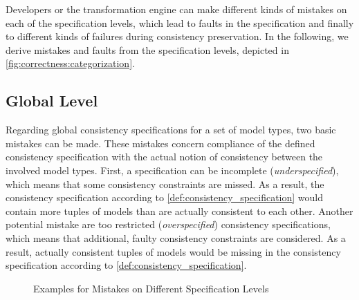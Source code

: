 Developers or the transformation engine can make different kinds of mistakes on each of the specification levels, which lead to faults in the specification and finally to different kinds of failures during consistency preservation.
In the following, we derive mistakes and faults from the specification levels, depicted in \autoref{fig:correctness:categorization}.

\subsection{Global Level}
Regarding global consistency specifications for a set of model types, two basic mistakes can be made. 
These mistakes concern compliance of the defined consistency specification with the actual notion of consistency between the involved model types.
First, a specification can be incomplete (\emph{underspecified}), which means that some consistency constraints are missed. 
As a result, the consistency specification according to \autoref{def:consistency_specification} would contain more tuples of models than are actually consistent to each other. 
Another potential mistake are too restricted (\emph{overspecified}) consistency specifications, which means that additional, faulty consistency constraints are considered. 
As a result, actually consistent tuples of models would be missing in the consistency specification according to \autoref{def:consistency_specification}. 

\begin{figure}[bt]
    \centering
    
    \caption{Examples for Mistakes on Different Specification Levels}
    \label{fig:correctness:mistakes_specification_levels}
\end{figure}

